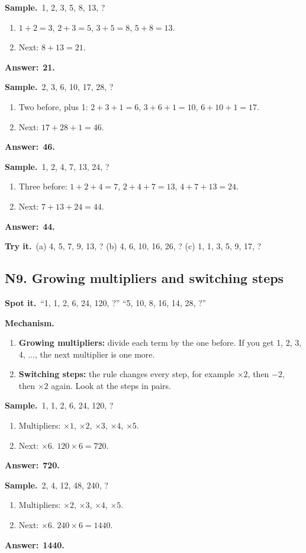 \documentclass[11pt,a4paper]{article}
\let\oldsubsection\subsection
\renewcommand{\subsection}{\needspace{9\baselineskip}\oldsubsection}
\newcommand{\spot}{\textbf{\color{ember}Spot it.}\ }
\newcommand{\mech}{\textbf{\color{ember}Mechanism.}\ }
\newif\ifkeepsamp
\newcommand{\ans}[1]{\par\nopagebreak\noindent\textbf{\color{ember}Answer:}\ \textbf{#1}\par}
\newcommand{\samp}{\ifkeepsamp\needspace{4\baselineskip}\fi\textbf{\color{ember}Sample.}\ }
\newcommand{\tryit}[1]{\textbf{\color{ember}Try it.}\ #1}
\begin{document}
\samp 1, 2, 3, 5, 8, 13, ?
\begin{enumerate}
\item $1 + 2 = 3$, $2 + 3 = 5$, $3 + 5 = 8$, $5 + 8 = 13$.
\item Next: $8 + 13 = 21$.
\end{enumerate}
\ans{21.}

\samp 2, 3, 6, 10, 17, 28, ?
\begin{enumerate}
\item Two before, plus 1: $2 + 3 + 1 = 6$, $3 + 6 + 1 = 10$, $6 + 10 + 1 = 17$.
\item Next: $17 + 28 + 1 = 46$.
\end{enumerate}
\ans{46.}

\samp 1, 2, 4, 7, 13, 24, ?
\begin{enumerate}
\item Three before: $1 + 2 + 4 = 7$, $2 + 4 + 7 = 13$, $4 + 7 + 13 = 24$.
\item Next: $7 + 13 + 24 = 44$.
\end{enumerate}
\ans{44.}

\tryit (a) 4, 5, 7, 9, 13, ? (b) 4, 6, 10, 16, 26, ? (c) 1, 1, 3, 5, 9, 17, ?

\subsection{N9. Growing multipliers and switching steps}
\spot ``1, 1, 2, 6, 24, 120, ?'' ``5, 10, 8, 16, 14, 28, ?''

\mech
\begin{enumerate}
\item \textbf{Growing multipliers:} divide each term by the one before. If you get 1, 2, 3, 4, ..., the next multiplier is one more.
\item \textbf{Switching steps:} the rule changes every step, for example $\times 2$, then $-2$, then $\times 2$ again. Look at the steps in pairs.
\end{enumerate}

\samp 1, 1, 2, 6, 24, 120, ?
\begin{enumerate}
\item Multipliers: $\times 1$, $\times 2$, $\times 3$, $\times 4$, $\times 5$.
\item Next: $\times 6$. $120 \times 6 = 720$.
\end{enumerate}
\ans{720.}

\samp 2, 4, 12, 48, 240, ?
\begin{enumerate}
\item Multipliers: $\times 2$, $\times 3$, $\times 4$, $\times 5$.
\item Next: $\times 6$. $240 \times 6 = 1440$.
\end{enumerate}
\ans{1440.}
\end{document}
